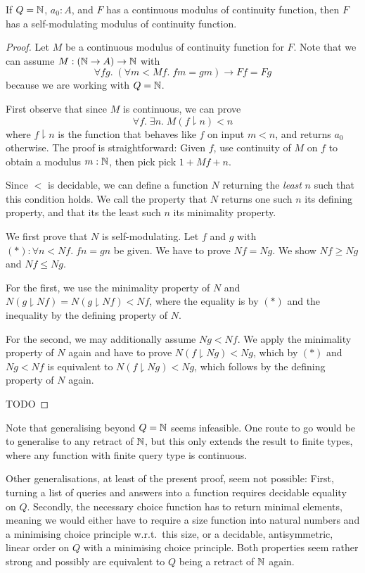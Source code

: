 \documentclass[a4paper,UKenglish,cleveref, autoref, thm-restate]{lipics-v2021}
\begin{document}
\begin{lemma}
  If $Q = \mathbb{N}$, $a_0 : A$, and $F$ has a continuous modulus of continuity function,
  then $F$ has a self-modulating modulus of continuity function.
\end{lemma}
\begin{proof}
  Let $M$ be a continuous modulus of continuity function for $F$.
  Note that we can assume $M : (\mathbb{N} \to A) \to \mathbb{N}$ with
  \[\forall f g.\; (\forall m < M f.\;f m = g m) \to F f = F g\]
  because we are working with $Q = \mathbb{N}$.

  First observe that since $M$ is continuous, we can prove
  \[ \forall f.\;\exists n.\; M (f \downharpoonright n) < n \]
  where $f \downharpoonright n$ is the function that behaves like $f$ on input $m < n$, and returns $a_0$ otherwise.
  The proof is straightforward: Given $f$, use continuity of $M$ on $f$ to obtain a modulus $m : \mathbb{N}$, then pick
  pick $1 + M f + n$.
  
  Since $<$ is decidable, we can define a function $N$ returning the \textit{least} $n$ such that this condition holds.
  We call the property that $N$ returns one such $n$ its defining property, and that its the least such $n$ its minimality property.
  
  We first prove that $N$ is self-modulating.
  Let $f$ and $g$ with $(*) : \forall n < N f.\; f n = g n$ be given.
  We have to prove $N f = N g$.
  We show $N f \geq N g$ and $N f \leq N g$.

  For the first,
  we use the minimality property of $N$ and
  $N (g \downharpoonright N f) =
  N (g \downharpoonright N f) < N f$,
  where the equality is by $(*)$ and the inequality by the defining property of $N$.

  For the second, we may additionally assume $N g < N f$.
  We apply the minimality property of $N$ again and have
  to prove $N (f \downharpoonright N g) < N g$,
  which by $(*)$ and $N g < N f$ is equivalent to $N (f \downharpoonright N g) < N g$, which follows by the defining property of $N$ again.

  TODO
\end{proof}

Note that generalising beyond $Q = \mathbb{N}$ seems infeasible.
One route to go would be to generalise to any retract of $\mathbb{N}$,
but this only extends the result to finite types,
where any function with finite query type is continuous.

Other generalisations, at least of the present proof, seem not possible:
First, turning a list of queries and answers into a function requires decidable equality on $Q$.
Secondly, the necessary choice function has to return minimal elements,
meaning we would either have to require a size function into natural numbers and a minimising choice principle w.r.t.\ this size,
or a decidable, antisymmetric, linear order on $Q$ with a minimising choice principle.
Both properties seem rather strong and possibly are equivalent to $Q$ being a retract of $\mathbb{N}$ again.  
\end{document}
